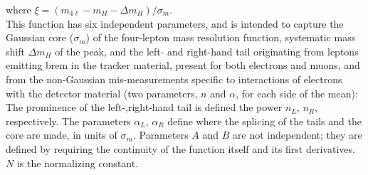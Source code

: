 where $ \xi = ( m_{4\ell} - m_{H} - \Delta m_{H} ) /\sigma_m$.\\
This function has six independent parameters, and is intended to
capture the Gaussian core ($\sigma_m$) of the four-lepton mass
resolution function, systematic mass shift $\Delta m_{H}$ of the
peak, and the left- and right-hand tail originating from leptons
emitting brem in the tracker material, present for both electrons and
muons, and from the non-Gaussian mis-measurements specific to
interactions of electrons with the detector material (two parameters,
$n$ and $\alpha$, for each side of the mean): The prominence of the
left-,right-hand tail is defined the power $n_L$, $n_R$, respectively.
The parameters $\alpha_L$, $\alpha_R$ define where the splicing of the
tails and the core are made, in units of $\sigma_m$. Parameters $A$ and $B$ are not
independent; they are defined by requiring the continuity of the
function itself and its first derivatives.  $N$ is the normalizing
constant.


